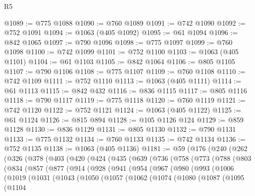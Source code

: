 \begin{lexlean}{R5}
\begin{coremodule}
@1089 := @775 @1088
@1090 := @760 @1089
@1091 := @742 @1090
@1092 := @752 @1091
@1094 := @1063 (@405 @1092)
@1095 := @61 @1094
@1096 := @842 @1065
@1097 := @790 @1096
@1098 := @775 @1097
@1099 := @760 @1098
@1100 := @742 @1099
@1101 := @752 @1100
@1103 := @1063 (@405 @1101)
@1104 := @61 @1103
@1105 := @842 @1064
@1106 := @805 @1105
@1107 := @790 @1106
@1108 := @775 @1107
@1109 := @760 @1108
@1110 := @742 @1109
@1111 := @752 @1110
@1113 := @1063 (@405 @1111)
@1114 := @61 @1113
@1115 := @842 @432
@1116 := @836 @1115
@1117 := @805 @1116
@1118 := @790 @1117
@1119 := @775 @1118
@1120 := @760 @1119
@1121 := @742 @1120
@1122 := @752 @1121
@1124 := @1063 (@405 @1122)
@1125 := @61 @1124
@1126 := @815 @894
@1128 := @105 @1126 @124
@1129 := @859 @1128
@1130 := @836 @1129
@1131 := @805 @1130
@1132 := @790 @1131
@1133 := @775 @1132
@1134 := @760 @1133
@1135 := @742 @1134
@1136 := @752 @1135
@1138 := @1063 (@405 @1136)
@1181 := @59
    (@176
      (@240
        (@262
          (@326
            (@378
              (@403
                (@420
                  (@424
                    (@435
                      (@639
                        (@736
                          (@758
                            (@773
                              (@788
                                (@803
                                  (@834
                                    (@857
                                      (@877
                                        (@914
                                          (@928
                                            (@941
                                              (@954
                                                (@967
                                                  (@980
                                                    (@993
                                                      (@1006
                                                        (@1019
                                                          (@1031
                                                            (@1043
                                                              (@1050
                                                                (@1057
                                                                  (@1062
                                                                    (@1074
                                                                      (@1080
                                                                        (@1087
                                                                          (@1095
                                                                            (@1104

\end{coremodule}
\end{lexlean}
